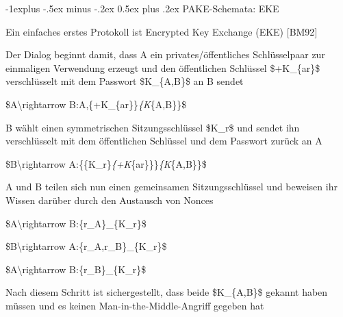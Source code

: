\documentclass[a4paper]{article}
\makeatletter
\renewcommand{\subsection}{\@startsection{subsection}{2}{0mm}%
 {-1explus -.5ex minus -.2ex}%
 {0.5ex plus .2ex}%
 {\normalfont\normalsize\bfseries}}
\makeatother
\begin{document}
\begin{multicols}{3}
      \subsection{PAKE-Schemata: EKE}

      \begin{itemize*}
            \item Ein einfaches erstes Protokoll ist Encrypted Key Exchange (EKE)
            {[}BM92{]}
            \item Der Dialog beginnt damit, dass A ein privates/öffentliches
            Schlüsselpaar zur einmaligen Verwendung erzeugt und den öffentlichen
            Schlüssel \$+K\_\{ar\}\$ verschlüsselt mit dem Passwort \$K\_\{A,B\}\$
            an B sendet
            \begin{enumerate*}
                  \def\labelenumi{\arabic{enumi}.}
                  \item \$A\textbackslash rightarrow B:A,\{+K\_\{ar\}\}\emph{\{K}\{A,B\}\}\$
            \end{enumerate*}
            \item B wählt einen symmetrischen Sitzungsschlüssel \$K\_r\$ und sendet ihn
            verschlüsselt mit dem öffentlichen Schlüssel und dem Passwort zurück
            an A
            \begin{enumerate*}
                  \def\labelenumi{\arabic{enumi}.}
                  \item \$B\textbackslash rightarrow A:\{\{K\_r\}\emph{\{+K}\{ar\}\}\}\emph{\{K}\{A,B\}\}\$
            \end{enumerate*}
            \item A und B teilen sich nun einen gemeinsamen Sitzungsschlüssel und
            beweisen ihr Wissen darüber durch den Austausch von Nonces
            \begin{enumerate*}
                  \def\labelenumi{\arabic{enumi}.}
                  \item \$A\textbackslash rightarrow B:\{r\_A\}\_\{K\_r\}\$
                  \item \$B\textbackslash rightarrow A:\{r\_A,r\_B\}\_\{K\_r\}\$
                  \item \$A\textbackslash rightarrow B:\{r\_B\}\_\{K\_r\}\$
            \end{enumerate*}
            \item Nach diesem Schritt ist sichergestellt, dass beide \$K\_\{A,B\}\$
            gekannt haben müssen und es keinen Man-in-the-Middle-Angriff gegeben
            hat
      \end{itemize*}



\end{multicols}
\end{document}
